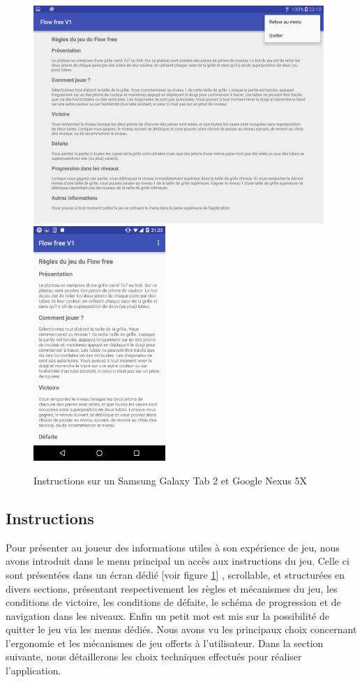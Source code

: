 \documentclass[12pt, a4paper]{article}%
\begin{document}
	\begin{figure}
\includegraphics[width=11cm]{Images/s2_2.png}\hfill
\includegraphics[width=5cm]{Images/nexus_2.png}
\caption{Instructions sur un Samsung Galaxy Tab 2 et Google Nexus 5X}\label{fig:instructions}
\end{figure}

	\subsection{Instructions}
	Pour présenter au joueur des informations utiles à son expérience de jeu, nous avons introduit dans le menu principal un accès aux instructions du jeu. Celle ci sont présentées dans un écran dédié [voir figure \ref{fig:instructions}] , scrollable, et structurées en divers sections, présentant respectivement les règles et mécanismes du jeu, les conditions de victoire, les conditions de défaite, le schéma de progression et de navigation dans les niveaux. Enfin un petit mot est mis sur la possibilité de quitter le jeu via les menus dédiés.
	\newline
	Nous avons vu les principaux choix concernant l'ergonomie et les mécanismes de jeu offerts à l'utilisateur. Dans la section suivante, nous détaillerons les choix techniques effectués pour réaliser l'application.
		 
\end{document}
